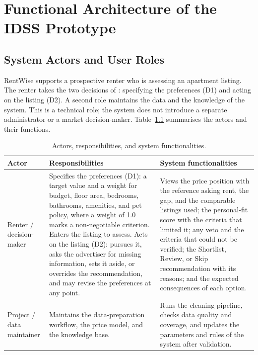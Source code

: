 \documentclass[12pt,a4paper]{report}
\begin{document}
\chapter{Functional Architecture of the IDSS Prototype}
\label{ch:architecture}

\section{System Actors and User Roles}

RentWise supports a prospective renter who is assessing an apartment listing.
The renter takes the two decisions of : specifying the
preferences (D1) and acting on the listing (D2). A second role maintains the
data and the knowledge of the system. This is a technical role; the system
does not introduce a separate administrator or a market decision-maker.
Table~\ref{tab:actors} summarises the actors and their functions.

\begin{table}[htbp]
\centering
\caption{Actors, responsibilities, and system functionalities.}
\label{tab:actors}
\begin{tabularx}{\textwidth}{p{} X X}
\toprule
\textbf{Actor} & \textbf{Responsibilities} & \textbf{System functionalities} \\
\midrule
Renter / decision-maker &
Specifies the preferences (D1): a target value and a weight for budget,
floor area, bedrooms, bathrooms, amenities, and pet policy, where a weight of
1.0 marks a non-negotiable criterion. Enters the listing to assess. Acts on
the listing (D2): pursues it, asks the advertiser for missing information,
sets it aside, or overrides the recommendation, and may revise the
preferences at any point. &
Views the price position with the reference asking rent, the gap, and the
comparable listings used; the personal-fit score with the criteria that
limited it; any veto and the criteria that could not be verified; the
Shortlist, Review, or Skip recommendation with its reasons; and the expected
consequences of each option. \\
\addlinespace
Project / data maintainer &
Maintains the data-preparation workflow, the price model, and the knowledge
base. &
Runs the cleaning pipeline, checks data quality and coverage, and updates
the parameters and rules of the system after validation. \\
\bottomrule
\end{tabularx}
\end{table}
\end{document}
